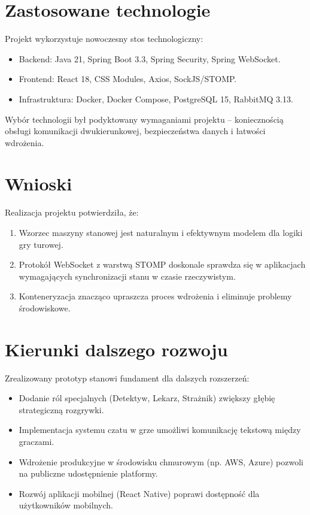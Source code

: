 ﻿\documentclass[a4paper,twoside,11pt]{mwrep}
\theoremstyle{plain} \newtheorem{thm}{Twierdzenie}
\theoremstyle{plain} \newtheorem{lem}{Lemat}
\theoremstyle{definition} \newtheorem{defn}{Definicja}
\theoremstyle{remark} \newtheorem*{rem}{Wniosek}
\begin{document}
\section*{Zastosowane technologie}

Projekt wykorzystuje nowoczesny stos technologiczny:
\begin{itemize}
    \item Backend: Java 21, Spring Boot 3.3, Spring Security, Spring WebSocket.
    \item Frontend: React 18, CSS Modules, Axios, SockJS/STOMP.
    \item Infrastruktura: Docker, Docker Compose, PostgreSQL 15, RabbitMQ 3.13.
\end{itemize}

Wybór technologii był podyktowany wymaganiami projektu -- koniecznością obsługi komunikacji dwukierunkowej, bezpieczeństwa danych i łatwości wdrożenia.

\section*{Wnioski}

Realizacja projektu potwierdziła, że:
\begin{enumerate}
    \item Wzorzec maszyny stanowej jest naturalnym i efektywnym modelem dla logiki gry turowej.
    \item Protokół WebSocket z warstwą STOMP doskonale sprawdza się w aplikacjach wymagających synchronizacji stanu w czasie rzeczywistym.
    \item Konteneryzacja znacząco upraszcza proces wdrożenia i eliminuje problemy środowiskowe.
\end{enumerate}

\section*{Kierunki dalszego rozwoju}

Zrealizowany prototyp stanowi fundament dla dalszych rozszerzeń:
\begin{itemize}
    \item Dodanie ról specjalnych (Detektyw, Lekarz, Strażnik) zwiększy głębię strategiczną rozgrywki.
    \item Implementacja systemu czatu w grze umożliwi komunikację tekstową między graczami.
    \item Wdrożenie produkcyjne w środowisku chmurowym (np. AWS, Azure) pozwoli na publiczne udostępnienie platformy.
    \item Rozwój aplikacji mobilnej (React Native) poprawi dostępność dla użytkowników mobilnych.
\end{itemize}
\end{document}
